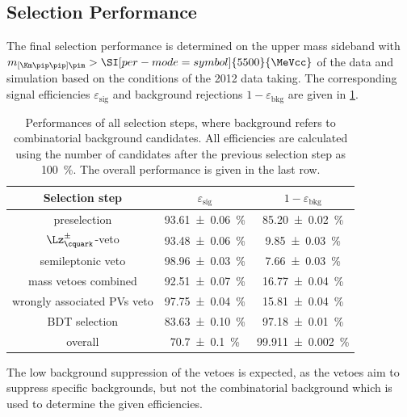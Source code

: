 \subsection{Selection Performance}
\label{sec:selectionPerformance}

The final selection performance is determined on the upper mass sideband with \mbox{$m_{\left[\Km\pip\pip\right]\pim}>\SI[per-mode=symbol]{5500}{\MeVcc}$} of the data and simulation based on the conditions of the \num{2012} data taking.
The corresponding signal efficiencies $\varepsilon_{\text{sig}}$ and background rejections $1-\varepsilon_{\text{bkg}}$ are given in \cref{tab:selPerform}.
\begin{table}[tbp]
	\centering
	\caption{Performances of all selection steps, where background refers to combinatorial background candidates.
	All efficiencies are calculated using the number of candidates after the previous selection step as \SI{100}{\percent}.
	The overall performance is given in the last row.}
	\begin{tabular}{ccc}
		\toprule
		Selection step						& $\varepsilon_{\text{sig}}$  & $1-\varepsilon_{\text{bkg}}$ \\
		\midrule
		preselection						& \SI{93.61\pm0.06}{\percent} & \SI{85.20\pm0.02}{\percent} \\
		\midrule
		$\Lz^\pm_\cquark$-veto				& \SI{93.48\pm0.06}{\percent} & \SI{9.85\pm0.03}{\percent} \\
		semileptonic veto					& \SI{98.96\pm0.03}{\percent} & \SI{7.66\pm0.03}{\percent} \\
		mass vetoes combined				& \SI{92.51\pm0.07}{\percent} & \SI{16.77\pm0.04}{\percent} \\
		\midrule
		wrongly associated \ac{PV}s veto	& \SI{97.75\pm0.04}{\percent} & \SI{15.81\pm0.04}{\percent} \\
		BDT selection						& \SI{83.63\pm0.10}{\percent} & \SI{97.18\pm0.01}{\percent} \\
		\midrule
		overall								& \SI{70.7\pm0.1}{\percent}   & \SI{99.911\pm0.002}{\percent} \\
		\bottomrule
	\end{tabular}
	\label{tab:selPerform}
\end{table}
The low background suppression of the vetoes is expected, as the vetoes aim to suppress specific backgrounds, but not the combinatorial background which is used to determine the given efficiencies.

